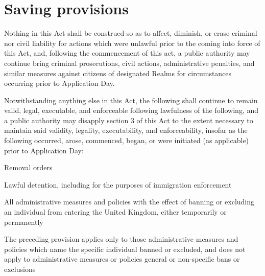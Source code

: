 \documentclass{ukbill}
\begin{document}
\section{Saving provisions}
\begin{numstat}
\item Nothing in this Act shall  be construed so as to affect, diminish, or erase criminal nor civil liability for actions which were unlawful prior to the coming into force of this Act, and, following the commencement of this act, a public authority may continue bring criminal prosecutions, civil actions, administrative penalties, and similar measures against citizens of designated Realms for circumstances occurring prior to Application Day.
\item Notwithstanding anything else in this Act, the following shall continue to remain valid, legal, executable, and enforceable following  lawfulness of the following, and a public authority may disapply section 3 of this Act to the extent necessary to maintain said validity, legality, executability, and enforceability,  insofar as the following occurred, arose, commenced, began, or were initiated (as applicable) prior to Application Day:
\begin{alphstat}
	\item Removal orders
	\item Lawful detention, including for the purposes of immigration enforcement
	\item All administrative measures and policies with the effect of banning or excluding an individual from entering the United Kingdom, either temporarily or permanently
	\begin{romstat}
	\item The preceding provision applies only to those  administrative measures and policies which name the specific individual banned or excluded, and does not apply to administrative measures or policies general 	or non-specific bans or exclusions \end{romstat}
	\end{alphstat}
\end{numstat}
\end{document}
